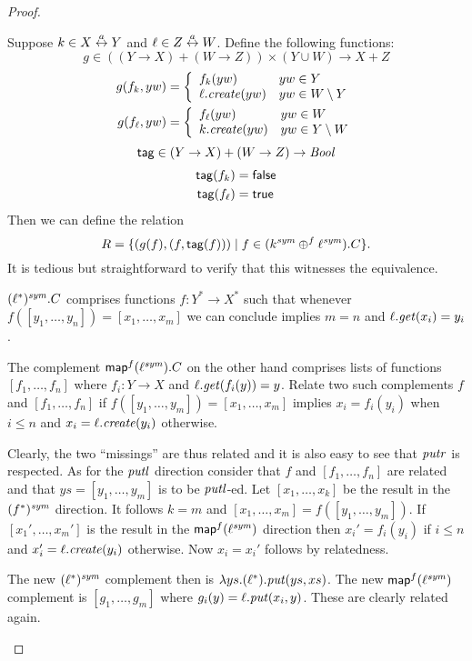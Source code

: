 \begin{defn}[$R$-similarity]
\begin{theorem}
\begin{lemma}
\begin{theorem}[No products]
\begin{lemma}
\begin{defn}
\begin{theorem}
\begin{theorem}
\begin{corollary}[Hylomorphism]
\begin{defn}
\begin{defn}
\begin{defn}[Symmetrization]
\begin{proof}
\begin{longenum}
\item Suppose $k \in X \overset{a}{\leftrightarrow} Y$ and $\ell \in Z \overset{a}{\leftrightarrow} W$.  Define the
following functions:
\[g \in ((Y \to X) + (W \to Z)) \times (Y \cup W) \to X + Z\]
\begin{align*}
    g( f_k,yw) &= \left\{\begin{array}{ll}
         f_k(yw) & yw \in Y \\
         \ell.\mathit{create}(yw) & yw \in W \setminus Y
        \end{array}\right. \\
    g( f_\ell,yw) &= \left\{\begin{array}{ll}
         f_\ell(yw) & yw \in W \\
         k.\mathit{create}(yw) & yw \in Y \setminus W
        \end{array}\right.
\end{align*}
\[\mathsf{tag} \in (Y \to X) + (W \to Z) \to \mathit{Bool}\]
\begin{align*}
    \mathsf{tag}( f_k) &= \mathsf{false} \\
    \mathsf{tag}( f_\ell) &= \mathsf{true}
\end{align*}
Then we can define the relation
\[R = \{(g(f),(f,\mathsf{tag}(f))) \mid f \in (k^\mathit{sym} \oplus^f \ell^\mathit{sym}).C\}.\]
It is tedious but straightforward to verify that this witnesses the
equivalence.
\item $(\ell^*)^\mathit{sym}.C$ comprises functions $f:Y^*\to X^*$ such that
\ifdissertation whenever \fi $f([y_1,\dots,y_n])=[x_1,\dots,x_m]$
\ifdissertation we can conclude \else implies \fi $m=n$ and
$\ell.\mathit{get}(x_i)=y_i$.

The complement $\mathsf{map}^f(\ell^\mathit{sym}).C$ on the other hand comprises lists
of functions $[f_1,\dots,f_n]$ where $f_i:Y\to X$ and
$\ell.\mathit{get}(f_i(y))=y$. Relate two such complements $f$ and
$[f_1,\dots,f_n]$ if $f([y_1,\dots,y_m])=[x_1,\dots,x_m]$ implies
$x_i=f_i(y_i)$ when $i\leq n$ and $x_i=\ell.\mathit{create}(y_i)$ otherwise. 

Clearly, the two ``missings'' are thus related and it is also easy to see
that $\mathit{putr}$ is respected. As for the $\mathit{putl}$ direction consider that
$f$ and $[f_1,\dots,f_n]$ are related and that $ys=[y_1,\dots,y_m]$ is
to be $\mathit{putl}$-ed. Let $[x_1,\dots,x_k]$ be the result in the
$(f^*)^\mathit{sym}$ direction. It follows $k=m$ and
$[x_1,\dots,x_m]=f([y_1,\dots,y_m])$. If $[x_1',\dots,x_m']$ is the
 result in the
$\mathsf{map}^f(\ell^\mathit{sym})$ direction then $x_i'=f_i(y_i)$ if $i\leq n$ and
$x_i'=\ell.\mathit{create}(y_i)$ otherwise. Now $x_i=x_i'$  follows by
relatedness. 

The new $(\ell^*)^\mathit{sym}$ complement then is $\lambda
ys.(\ell^*).\mathit{put}(ys,xs)$. The new $\mathsf{map}^f(\ell^\mathit{sym})$ complement is
$[g_1,\dots,g_m]$ where $g_i(y)=\ell.\mathit{put}(x_i,y)$. These are clearly
related again. 
\endofpf
\end{longenum}
\end{proof}
\fi


\end{defn}
\end{defn}
\end{defn}
\end{corollary}
\end{theorem}
\end{theorem}
\end{defn}
\end{lemma}
\end{theorem}
\end{lemma}
\end{theorem}
\end{defn}
